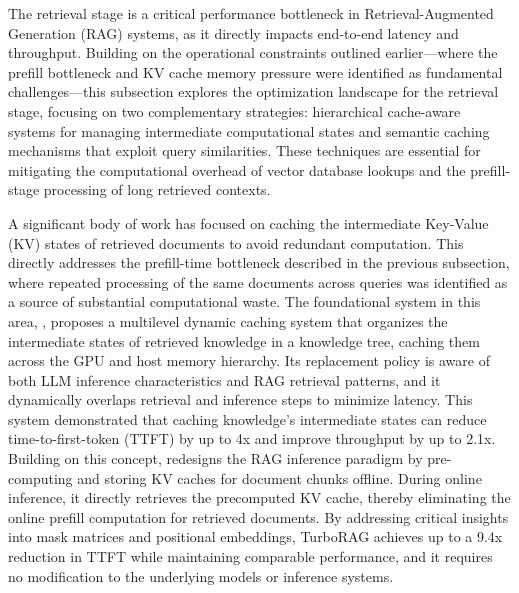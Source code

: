 \documentclass[11pt]{article}
\begin{document}
The retrieval stage is a critical performance bottleneck in Retrieval-Augmented Generation (RAG) systems, as it directly impacts end-to-end latency and throughput. Building on the operational constraints outlined earlier---where the prefill bottleneck and KV cache memory pressure were identified as fundamental challenges---this subsection explores the optimization landscape for the retrieval stage, focusing on two complementary strategies: hierarchical cache-aware systems for managing intermediate computational states and semantic caching mechanisms that exploit query similarities. These techniques are essential for mitigating the computational overhead of vector database lookups and the prefill-stage processing of long retrieved contexts.

A significant body of work has focused on caching the intermediate Key-Value (KV) states of retrieved documents to avoid redundant computation. This directly addresses the prefill-time bottleneck described in the previous subsection, where repeated processing of the same documents across queries was identified as a source of substantial computational waste. The foundational system in this area, \cite{ref510}, proposes a multilevel dynamic caching system that organizes the intermediate states of retrieved knowledge in a knowledge tree, caching them across the GPU and host memory hierarchy. Its replacement policy is aware of both LLM inference characteristics and RAG retrieval patterns, and it dynamically overlaps retrieval and inference steps to minimize latency. This system demonstrated that caching knowledge's intermediate states can reduce time-to-first-token (TTFT) by up to 4x and improve throughput by up to 2.1x. Building on this concept, \cite{ref511} redesigns the RAG inference paradigm by pre-computing and storing KV caches for document chunks offline. During online inference, it directly retrieves the precomputed KV cache, thereby eliminating the online prefill computation for retrieved documents. By addressing critical insights into mask matrices and positional embeddings, TurboRAG achieves up to a 9.4x reduction in TTFT while maintaining comparable performance, and it requires no modification to the underlying models or inference systems.
\end{document}
